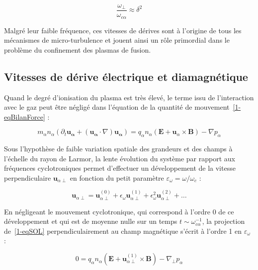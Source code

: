 \begin{refsection}
\begin{equation}
\frac{\omega_\perp}{\omega_{c\alpha}}\approx \delta^2
\end{equation}

Malgré leur faible fréquence, ces vitesses de dérives sont à l'origine de tous
les mécanismes de micro-turbulence et jouent ainsi un rôle primordial dans le
problème du confinement des plasmas de fusion.

\subsection{Vitesses de dérive électrique et diamagnétique}

Quand le degré d'ionisation du plasma est très élevé, le terme issu de
l'interaction avec le gaz peut être négligé dans l'équation de la quantité de
mouvement~\eqref{1-eqBilanForce} :

\begin{equation}
\label{1-eqSOL}
 m_\alpha n_\alpha\left(\partial_t \mathbf{u_\alpha} +
(\mathbf{u_\alpha}\cdot\nabla)\mathbf{u_\alpha}\right)
={q_\alpha n_\alpha}\left(\mathbf E+\mathbf
u_\alpha\times \mathbf B\right)
-{\nabla p_\alpha}
\end{equation}

 Sous l'hypothèse de faible variation spatiale des grandeurs et des champs à
 l'échelle du rayon de Larmor, la lente évolution du système par rapport aux
 fréquences cyclotroniques permet d'effectuer un développement de la vitesse
 perpendiculaire $\mathbf u_{\alpha\perp}$ en fonction du petit paramètre
 $\varepsilon_\omega=\omega/\omega_{c}$ :
 
 \begin{equation}
 \label{2-developEqMvt}
 \mathbf u_{\alpha\perp}=\mathbf
 u_{\alpha\perp}^{(0)}+\epsilon_\omega \mathbf
 u_{\alpha\perp}^{(1)}+\epsilon^2_\omega \mathbf u_{\alpha\perp}^{(2)}+\ldots
 \end{equation}
 
 En négligeant le mouvement cyclotronique, qui correspond à l'ordre 0 de ce développement et qui
 est de moyenne nulle sur un temps $t\sim\omega_{c\alpha}^{-1}$, la projection
 de~\eqref{1-eqSOL} perpendiculairement au champ magnétique s'écrit à l'ordre 1
 en $\varepsilon_\omega$ :
 
 \begin{equation}
\label{1-eqSOLperp}
0
={q_\alpha n_\alpha}\left(\mathbf E+\mathbf
u_{\alpha\perp}^{(1)}\times \mathbf B\right)
-{\nabla_\perp p_\alpha}
\end{equation}


\end{refsection}
